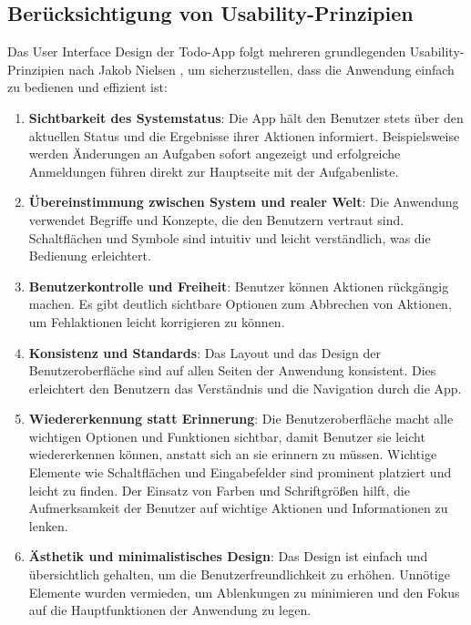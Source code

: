 \subsection{Berücksichtigung von Usability-Prinzipien}

Das User Interface Design der Todo-App folgt mehreren grundlegenden Usability-Prinzipien nach Jakob Nielsen \cite{nielsen_10_nodate}, um sicherzustellen, dass die Anwendung einfach zu bedienen und effizient ist:

\begin{enumerate}
	\item \textbf{Sichtbarkeit des Systemstatus}: Die App hält den Benutzer stets über den aktuellen Status und die Ergebnisse ihrer Aktionen informiert. Beispielsweise werden Änderungen an Aufgaben sofort angezeigt und erfolgreiche Anmeldungen führen direkt zur Hauptseite mit der Aufgabenliste.
	\item \textbf{Übereinstimmung zwischen System und realer Welt}: Die Anwendung verwendet Begriffe und Konzepte, die den Benutzern vertraut sind. Schaltflächen und Symbole sind intuitiv und leicht verständlich, was die Bedienung erleichtert.
	\item \textbf{Benutzerkontrolle und Freiheit}: Benutzer können Aktionen rückgängig machen. Es gibt deutlich sichtbare Optionen zum Abbrechen von Aktionen, um Fehlaktionen leicht korrigieren zu können.
	\item \textbf{Konsistenz und Standards}: Das Layout und das Design der Benutzeroberfläche sind auf allen Seiten der Anwendung konsistent. Dies erleichtert den Benutzern das Verständnis und die Navigation durch die App.
	\item \textbf{Wiedererkennung statt Erinnerung}: Die Benutzeroberfläche macht alle wichtigen Optionen und Funktionen sichtbar, damit Benutzer sie leicht wiedererkennen können, anstatt sich an sie erinnern zu müssen. Wichtige Elemente wie Schaltflächen und Eingabefelder sind prominent platziert und leicht zu finden. Der Einsatz von Farben und Schriftgrößen hilft, die Aufmerksamkeit der Benutzer auf wichtige Aktionen und Informationen zu lenken.
	\item \textbf{Ästhetik und minimalistisches Design}: Das Design ist einfach und übersichtlich gehalten, um die Benutzerfreundlichkeit zu erhöhen. Unnötige Elemente wurden vermieden, um Ablenkungen zu minimieren und den Fokus auf die Hauptfunktionen der Anwendung zu legen.

\end{enumerate}
